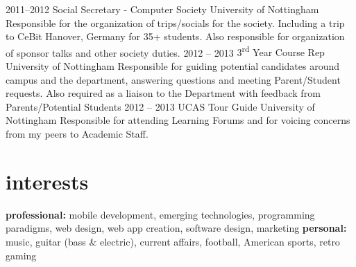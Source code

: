 \documentclass[]{friggeri-cv} %
\begin{document}
\begin{entrylist}
\entry
{2011--2012}
{Social Secretary - Computer Society}
{University of Nottingham}
{Responsible for the organization of trips/socials for the society.
Including a trip to CeBit Hanover, Germany for 35+ students. Also responsible for organization of sponsor talks and other society duties.}
\entry
{2012 -- 2013}
{3\textsuperscript{rd} Year Course Rep}
{University of Nottingham}
{Responsible for guiding potential candidates around campus and the department, answering questions and meeting Parent/Student requests. Also required as a liaison to the Department with feedback from Parents/Potential Students}
\entry
{2012 -- 2013}
{UCAS Tour Guide}
{University of Nottingham}
{Responsible for attending Learning Forums and for voicing concerns from my peers to Academic Staff.}
\end{entrylist}


\section{interests}

\textbf{professional:} mobile development, emerging technologies, programming paradigms, web design, web app creation, software design, marketing \textbf{personal:} music, guitar (bass \& electric), current affairs, football, American sports, retro gaming




\end{document}
